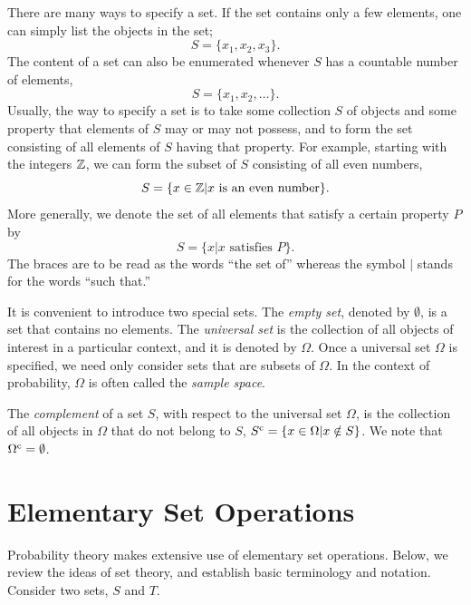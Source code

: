 There are many ways to specify a set.
If the set contains only a few elements, one can simply list the objects in the set;
\begin{equation*}
S = \{ x_1, x_2, x_3 \} .
\end{equation*}
The content of a set can also be enumerated whenever $S$ has a countable number of elements,
\begin{equation*}
S = \{ x_1, x_2, \ldots \} .
\end{equation*}
Usually, the way to specify a set is to take some collection $S$ of objects and some property that elements of $S$ may or may not possess, and to form the set consisting of all elements of $S$ having that property.
For example, starting with the integers $\mathbb{Z}$, we can form the subset of $S$ consisting of all even numbers,
\begin{equation*}
S = \{ x \in \mathbb{Z} | x \text{ is an even number} \}.
\end{equation*}
More generally, we denote the set of all elements that satisfy a certain property $P$ by
\begin{equation*}
S = \{ x | x \text{ satisfies } P \} .
\end{equation*}
The braces are to be read as the words ``the set of'' whereas the symbol $|$ stands for the words ``such that.''

It is convenient to introduce two special sets.
The \emph{empty set}, denoted by $\emptyset$, is a set that contains no elements. 
The \emph{universal set} is the collection of all objects of interest in a particular context, and it is denoted by $\Omega$.
Once a universal set $\Omega$ is specified, we need only consider sets that are subsets of $\Omega$.
In the context of probability, $\Omega$ is often called the \emph{sample space}. 

The \emph{complement} of a set $S$, with respect to the universal set $\Omega$, is the collection of all objects in $\Omega$ that do not belong to $S$, 
$S^{\mathrm{c}} = \{ x \in \Omega | x \notin S \}$.
We note that $\Omega^{\mathrm{c}} = \emptyset$.


\section{Elementary Set Operations}

Probability theory makes extensive use of elementary set operations.
Below, we review the ideas of set theory, and establish basic terminology and notation.
Consider two sets, $S$ and $T$.

